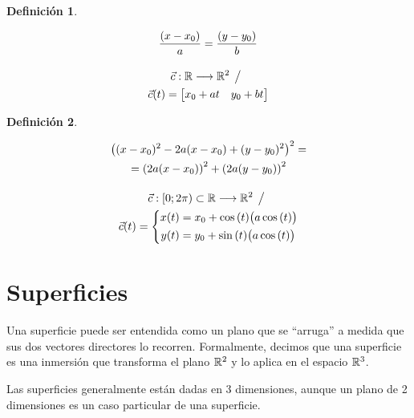 \documentclass[a5paper,12pt,twoside]{book}
\newtheorem{defn}{{Definición}}[chapter]
\begin{document}

\begin{mdframed}[style=MyFrame1]
    \begin{defn}
    \end{defn}
    \begin{gather*}
        \dfrac{(x-x_0)}{a}=\dfrac{(y-y_0)}{b}
        \\[1em]
        \Vec{c}: \mathbb{R} \longrightarrow \mathbb{R}^2 \hspace{1ex} \big/ \hspace{1ex}
        \\
        \Vec{c}(t) = \begin{bmatrix} x_0 + at & y_0 + bt \end{bmatrix}
    \end{gather*}
\end{mdframed}


\begin{mdframed}[style=MyFrame1]
    \begin{defn}
    \end{defn}
    \begin{gather*}
        \left( (x-x_0)^2 - 2a(x-x_0) + (y-y_0)^2 \right)^2 = \\
        = \left( 2a(x-x_0) \right)^2 + \left( 2a(y-y_0) \right)^2
        \\[1em]
        \Vec{c}:[0;2 \pi) \subset \mathbb{R} \longrightarrow \mathbb{R}^2 \hspace{1ex} \big/ \hspace{1ex}
        \\
        \Vec{c}(t) = \left\{
        \begin{aligned}
            x(t) &= x_0 + \cos{(t)} \big( a\cos{(t)} \big) \\
            y(t) &= y_0 + \sin{(t)} \big( a\cos{(t)} \big)
        \end{aligned}
        \right.
    \end{gather*}
\end{mdframed}


\section{Superficies}

Una superficie puede ser entendida como un plano que se ``arruga'' a medida que sus dos vectores directores lo recorren. Formalmente, decimos que una superficie es una inmersión que transforma el plano $\mathbb{R}^2$ y lo aplica en el espacio $\mathbb{R}^3$.

Las superficies generalmente están dadas en 3 dimensiones, aunque un plano de 2 dimensiones es un caso particular de una superficie.
\end{document}
